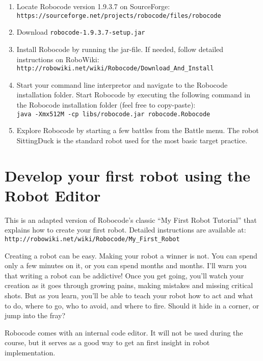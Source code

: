 \documentclass{scrreprt}
\begin{document}
\begin{enumerate}
\item Locate Robocode version 1.9.3.7 on SourceForge:\\\texttt{https://sourceforge.net/projects/robocode/files/robocode}
\item Download \texttt{robocode-1.9.3.7-setup.jar}
\item Install Robocode by running the jar-file. If needed, follow detailed instructions on RoboWiki:\\\texttt{http://robowiki.net/wiki/Robocode/Download\_And\_Install}
\item Start your command line interpretor and navigate to the Robocode installation folder. Start Robocode by executing the following command in the Robocode installation folder (feel free to copy-paste):\\
\texttt{java~-Xmx512M~-cp~libs/robocode.jar~robocode.Robocode}
\item Explore Robocode by starting a few battles from the Battle menu. The robot SittingDuck is the standard robot used for the most basic target practice.
\end{enumerate}

\section{Develop your first robot using the Robot Editor} \label{sec:myfirstrobot}
This is an adapted version of Robocode's classic ``My First Robot Tutorial'' that explains how to create your first robot. Detailed instructions are available at:\\\texttt{http://robowiki.net/wiki/Robocode/My\_First\_Robot}

Creating a robot can be easy. Making your robot a winner is not. You can spend only a few minutes on it, or you can spend months and months. I'll warn you that writing a robot can be addictive! Once you get going, you'll watch your creation as it goes through growing pains, making mistakes and missing critical shots. But as you learn, you'll be able to teach your robot how to act and what to do, where to go, who to avoid, and where to fire. Should it hide in a corner, or jump into the fray?

Robocode comes with an internal code editor. It will not be used during the course, but it serves as a good way to get an first insight in robot implementation.
\end{document}
